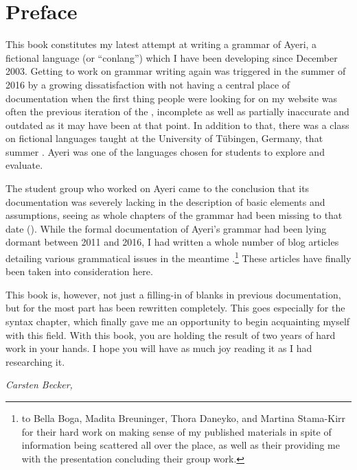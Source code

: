 \chapter{Preface}

This book constitutes my latest attempt at writing a grammar of Ayeri, a
fictional language (or \enquote{conlang}) which I have been developing since
December 2003. Getting to work on grammar writing again was triggered in the
summer of 2016 by a growing dissatisfaction with not having a central place of
documentation when the first thing people were looking for on my website was
often the previous iteration of the , incomplete as well as
partially inaccurate and outdated as it may have been at that point. In
addition to that, there was a class on fictional languages taught at the
University of Tübingen, Germany, that summer \autocite{buch2016ss}. Ayeri was
one of the languages chosen for students to explore and evaluate.

The student group who worked on Ayeri came to the conclusion that its
documentation was severely lacking in the description of basic elements and
assumptions, seeing as whole chapters of the grammar had been missing to that
date (\cite[12]{boga2016}). While the formal documentation of Ayeri's grammar
had been lying dormant between 2011 and 2016, I had written a whole number of
blog articles detailing various grammatical issues in the meantime
\autocite[Blog]{benung}.\footnote{ to Bella Boga, Madita Breuninger, Thora Daneyko, and Martina Stama-Kirr
for their hard work on making sense of my published materials in spite of
information being scattered all over the place, as well as their providing me
with the presentation concluding their group work.} These articles have
finally been taken into consideration here.

This book is, however, not just a filling-in of blanks in previous
documentation, but for the most part has been rewritten completely. This goes
especially for the syntax chapter, which finally gave me an opportunity to
begin acquainting myself with this field. With this book, you are holding the
result of two years of hard work in your hands. I hope you will have as much
joy reading it as I had researching it.

\begin{flushright}\itshape\footnotesize
{}
Carsten Becker,  \the\year
\end{flushright}